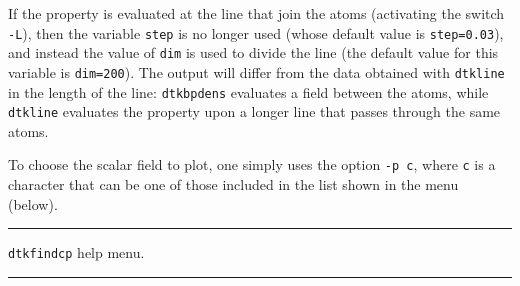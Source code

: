 If the property is evaluated at the line that join the atoms (activating the switch \texttt{-L}), then the variable \texttt{step} is no longer used (whose default value is \texttt{step=0.03}), and instead the value of \texttt{dim} is used to divide the line (the default value for this variable is \texttt{dim=200}). The output will differ from the data obtained with \texttt{dtkline} in the length of the line: \texttt{dtkbpdens} evaluates a field between the atoms, while \texttt{dtkline} evaluates the property upon a longer line that passes through the same atoms.

To choose the scalar field to plot, one simply uses the option \texttt{-p c}, where \texttt{c} is a character that can be one of those included in the list shown in the menu (below).

\rule{\textwidth}{1pt}
{\center\texttt{dtkfindcp} help menu.\\}
\rule{\textwidth}{1pt}
